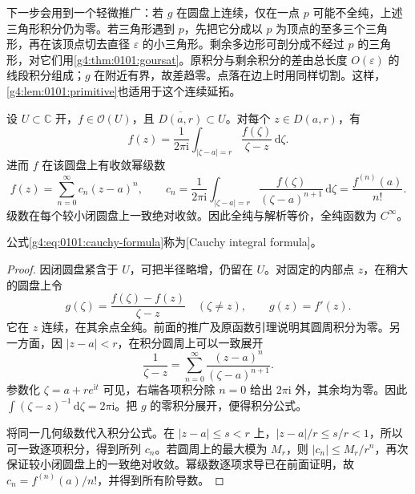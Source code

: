 下一步会用到一个轻微推广：若 \(g\) 在圆盘上连续，仅在一点 \(p\) 可能不全纯，上述三角形积分仍为零。若三角形遇到 \(p\)，先把它分成以 \(p\) 为顶点的至多三个三角形，再在该顶点切去直径 \(\varepsilon\) 的小三角形。剩余多边形可剖分成不经过 \(p\) 的三角形，对它们用\cref{g4:thm:0101:goursat}。原积分与剩余积分的差由总长度 \(O(\varepsilon)\) 的线段积分组成；\(g\) 在附近有界，故差趋零。点落在边上时用同样切割。这样，\cref{g4:lem:0101:primitive}也适用于这个连续延拓。

\begin{theorem}
	\label{g4:thm:0101:cauchy-formula}
	设 \(U\subset\mathbb C\) 开，\(f\in\mathcal O(U)\)，且 \(\overline{D(a,r)}\subset U\)。对每个 \(z\in D(a,r)\)，有
	\begin{equation}
		\label{g4:eq:0101:cauchy-formula}
		f(z)=\frac{1}{2\pi\mathrm i}\int_{|\zeta-a|=r}
		\frac{f(\zeta)}{\zeta-z}\,\mathrm{d}\zeta.
	\end{equation}
	进而 \(f\) 在该圆盘上有收敛幂级数
	\begin{equation}
		\label{g4:eq:0101:power-series}
		f(z)=\sum_{n=0}^\infty c_n(z-a)^n,\qquad
		c_n=\frac{1}{2\pi\mathrm i}\int_{|\zeta-a|=r}
		\frac{f(\zeta)}{(\zeta-a)^{n+1}}\,\mathrm{d}\zeta
		=\frac{f^{(n)}(a)}{n!}.
	\end{equation}
	级数在每个较小闭圆盘上一致绝对收敛。因此全纯与解析等价，全纯函数为 \(C^\infty\)。
\end{theorem}
公式\eqref{g4:eq:0101:cauchy-formula}称为[Cauchy integral formula]。
\begin{proof}
	因闭圆盘紧含于 \(U\)，可把半径略增，仍留在 \(U\)。对固定的内部点 \(z\)，在稍大的圆盘上令
	\[
		g(\zeta)=\frac{f(\zeta)-f(z)}{\zeta-z}\quad(\zeta\ne z),\qquad g(z)=f'(z).
	\]
	它在 \(z\) 连续，在其余点全纯。前面的推广及原函数引理说明其圆周积分为零。另一方面，因 \(|z-a|<r\)，在积分圆周上可以一致展开
	\[
		\frac1{\zeta-z}
		=\sum_{n=0}^\infty\frac{(z-a)^n}{(\zeta-a)^{n+1}}.
	\]
	参数化 \(\zeta=a+r e^{\mathrm i t}\) 可见，右端各项积分除 \(n=0\) 给出 \(2\pi\mathrm i\) 外，其余均为零。因此 \(\int(\zeta-z)^{-1}\,\mathrm{d}\zeta=2\pi\mathrm i\)。把 \(g\) 的零积分展开，便得积分公式。

	将同一几何级数代入积分公式。在 \(|z-a|\le s<r\) 上，\(|z-a|/r\le s/r<1\)，所以可一致逐项积分，得到所列 \(c_n\)。若圆周上的最大模为 \(M_r\)，则 \(|c_n|\le M_r/r^n\)，再次保证较小闭圆盘上的一致绝对收敛。幂级数逐项求导已在前面证明，故 \(c_n=f^{(n)}(a)/n!\)，并得到所有阶导数。
\end{proof}

